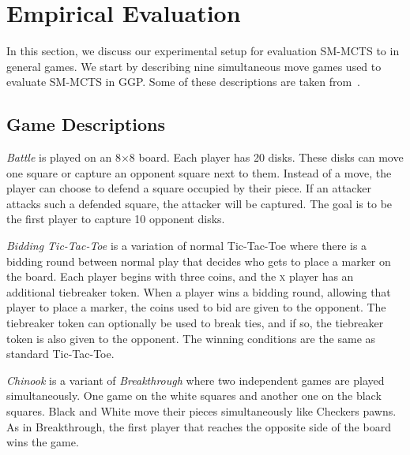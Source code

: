 \documentclass[conference]{IEEEtran}
\begin{document}
\section{Empirical Evaluation}
\label{sec:exp}

In this section, we discuss our experimental setup for evaluation SM-MCTS to in general games.
We start by describing nine simultaneous move games used to evaluate SM-MCTS in GGP. Some of these 
descriptions are taken from~\cite[Appendix C]{Finnsson12}.


\subsection{Game Descriptions}
\label{subsec:games}

\textit{Battle} is played on an 8$\times$8 board. Each player has 20 disks. These disks can move one square or 
capture an opponent square next to them. Instead of a move, the player can choose to defend a square occupied by their 
piece. If an attacker attacks such a defended square, the attacker will be captured. The goal is to be the first player 
to capture 10 opponent disks. 

\textit{Bidding Tic-Tac-Toe} is a variation of normal Tic-Tac-Toe where there is a bidding round between 
normal play that decides who gets to place a marker on the board. Each player begins with three coins, and the 
\textsc{x} player has an additional tiebreaker token. When a player wins a bidding round, allowing that player to 
place a marker, the coins used to bid are given to the opponent. The tiebreaker token can optionally be used to break 
ties, and if so, the tiebreaker token is also given to the opponent. The winning conditions are the same as 
standard Tic-Tac-Toe. 

\textit{Chinook} is a variant of \textit{Breakthrough} where two independent games are played simultaneously. 
One game on the white squares and another one on the black squares. Black and White move their pieces simultaneously 
like Checkers pawns. As in Breakthrough, the first player that reaches the opposite side of the board wins the game. 
\end{document}
